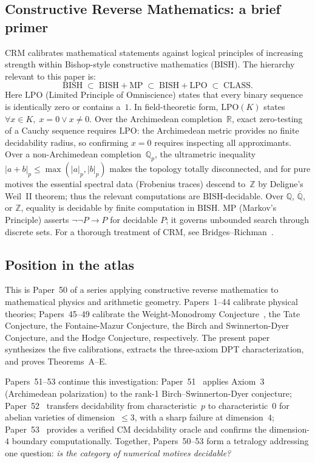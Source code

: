 \documentclass[11pt]{article}
\theoremstyle{definition}
\theoremstyle{remark}
\newcommand{\Z}{\mathbb{Z}}
\newcommand{\Q}{\mathbb{Q}}
\newcommand{\R}{\mathbb{R}}
\newcommand{\Qbar}{\overline{\Q}}
\newcommand{\Qp}{\Q_p}
\newcommand{\LPO}{\mathrm{LPO}}
\newcommand{\MP}{\mathrm{MP}}
\newcommand{\BISH}{\mathrm{BISH}}
\newcommand{\CRM}{\mathrm{CRM}}
\newcommand{\CLASS}{\mathrm{CLASS}}
\begin{document}
\subsection{Constructive Reverse Mathematics: a brief primer}

$\CRM$ calibrates mathematical statements against logical principles of increasing strength within Bishop-style constructive mathematics ($\BISH$). The hierarchy relevant to this paper is:
\[
\BISH \;\subset\; \BISH + \MP \;\subset\; \BISH + \LPO \;\subset\; \CLASS.
\]
Here $\LPO$ (Limited Principle of Omniscience) states that every binary sequence is identically zero or contains a~$1$. In field-theoretic form, $\LPO(K)$ states $\forall x \in K,\; x = 0 \lor x \neq 0$. Over the Archimedean completion~$\R$, exact zero-testing of a Cauchy sequence requires $\LPO$: the Archimedean metric provides no finite decidability radius, so confirming $x = 0$ requires inspecting all approximants. Over a non-Archimedean completion~$\Qp$, the ultrametric inequality $|a + b|_p \leq \max(|a|_p, |b|_p)$ makes the topology totally disconnected, and for pure motives the essential spectral data (Frobenius traces) descend to~$\Z$ by Deligne's Weil~II theorem; thus the relevant computations are $\BISH$-decidable. Over $\Q$, $\Qbar$, or $\Z$, equality is decidable by finite computation in $\BISH$. $\MP$ (Markov's Principle) asserts $\lnot\lnot P \to P$ for decidable $P$; it governs unbounded search through discrete sets. For a thorough treatment of $\CRM$, see Bridges--Richman~\cite{BridgesRichman1987}.

\subsection{Position in the atlas}

This is Paper~50 of a series applying constructive reverse mathematics to mathematical physics and arithmetic geometry. Papers~1--44 calibrate physical theories; Papers~45--49 calibrate the Weight-Monodromy Conjecture~\cite{Paper45}, the Tate Conjecture, the Fontaine-Mazur Conjecture, the Birch and Swinnerton-Dyer Conjecture, and the Hodge Conjecture, respectively. The present paper synthesizes the five calibrations, extracts the three-axiom DPT characterization, and proves Theorems~A--E.

Papers~51--53 continue this investigation: Paper~51~\cite{Paper51} applies Axiom~3 (Archimedean polarization) to the rank-1 Birch--Swinnerton-Dyer conjecture; Paper~52~\cite{Paper52} transfers decidability from characteristic~$p$ to characteristic~$0$ for abelian varieties of dimension~$\le 3$, with a sharp failure at dimension~$4$; Paper~53~\cite{Paper53} provides a verified CM decidability oracle and confirms the dimension-$4$ boundary computationally.  Together, Papers~50--53 form a tetralogy addressing one question: \emph{is the category of numerical motives decidable?}
\end{document}
